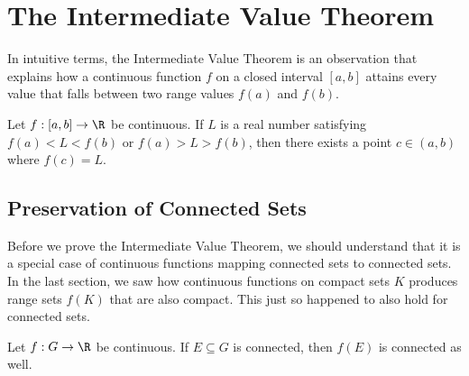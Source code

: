 \section{The Intermediate Value Theorem}

In intuitive terms, the Intermediate Value Theorem is an observation that explains how a continuous function \( f \) on a closed interval \( [a,b] \) attains every value that falls between two range values \( f(a) \) and \( f(b) \).


\begin{tcolorbox}
    \begin{thm}
    Let \( f: [a,b] \to \R  \) be continuous. If \( L  \) is a real number satisfying \( f(a) < L < f(b) \) or \( f(a) > L > f(b) \), then there exists a point \( c \in (a,b) \) where \( f(c) = L  \).
    \end{thm}
\end{tcolorbox}

\subsection{Preservation of Connected Sets}

Before we prove the Intermediate Value Theorem, we should understand that it is a special case of continuous functions mapping connected sets to connected sets. In the last section, we saw how continuous functions on compact sets \( K  \) produces range sets \( f(K) \) that are also compact. This just so happened to also hold for connected sets.


\begin{tcolorbox}
    \begin{thm}
    Let \( f: G \to \R  \) be continuous. If \( E \subseteq G  \) is connected, then \( f(E) \) is connected as well.
    \end{thm}
\end{tcolorbox}

